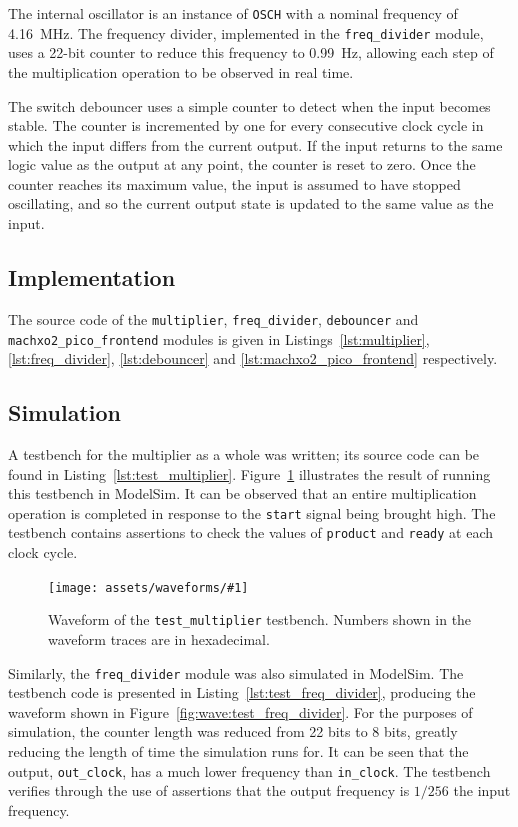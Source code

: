 \documentclass[a4paper]{article}
\newcommand{\waveformfigure}[2]{
  \begin{figure}[tp]
    \centering\texttt{[image: assets/waveforms/\#1]}
    \caption{#2}
    \label{fig:wave:#1}
  \end{figure}
}
\begin{document}
The internal oscillator is an instance of \texttt{OSCH} with a nominal frequency of \SI{4.16}{\mega\hertz}. The frequency divider, implemented in the \texttt{freq\_divider} module, uses a 22-bit counter to reduce this frequency to \SI{0.99}{\hertz}, allowing each step of the multiplication operation to be observed in real time.

The switch debouncer uses a simple counter to detect when the input becomes stable. The counter is incremented by one for every consecutive clock cycle in which the input differs from the current output. If the input returns to the same logic value as the output at any point, the counter is reset to zero. Once the counter reaches its maximum value, the input is assumed to have stopped oscillating, and so the current output state is updated to the same value as the input.

\subsection{Implementation}
\label{sec:mult:impl}

The source code of the \texttt{multiplier}, \texttt{freq\_divider}, \texttt{debouncer} and \texttt{machxo2\_pico\_frontend} modules is given in Listings~\ref{lst:multiplier}, \ref{lst:freq_divider}, \ref{lst:debouncer} and \ref{lst:machxo2_pico_frontend} respectively.

\subsection{Simulation}
\label{sec:mult:sim}

A testbench for the multiplier as a whole was written; its source code can be found in Listing~\ref{lst:test_multiplier}. Figure~\ref{fig:wave:test_multiplier} illustrates the result of running this testbench in ModelSim. It can be observed that an entire multiplication operation is completed in response to the \texttt{start} signal being brought high. The testbench contains assertions to check the values of \texttt{product} and \texttt{ready} at each clock cycle.

\waveformfigure{test_multiplier}{Waveform of the \texttt{test\_multiplier} testbench. Numbers shown in the waveform traces are in hexadecimal.}

Similarly, the \texttt{freq\_divider} module was also simulated in ModelSim. The testbench code is presented in Listing~\ref{lst:test_freq_divider}, producing the waveform shown in Figure~\ref{fig:wave:test_freq_divider}. For the purposes of simulation, the counter length was reduced from 22 bits to 8 bits, greatly reducing the length of time the simulation runs for. It can be seen that the output, \texttt{out\_clock}, has a much lower frequency than \texttt{in\_clock}. The testbench verifies through the use of assertions that the output frequency is $1/256$ the input frequency.
\end{document}
